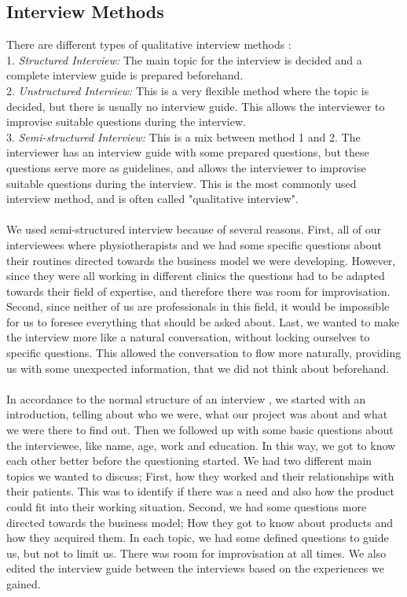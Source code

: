 \subsection{Interview Methods}
There are different types of qualitative interview methods \cite{interview} \cite{interview2}: \\ 
1. \emph{Structured Interview:} The main topic for the interview is decided and a complete interview guide is prepared beforehand. \\ 
2. \emph{Unstructured Interview:} This is a very flexible method where the topic is decided, but there is usually no interview guide. This allows the interviewer to improvise suitable questions during the interview. \\ 
3. \emph{Semi-structured Interview:} This is a mix between method 1 and 2. The interviewer has an interview guide with some prepared questions, but these questions serve more as guidelines, and allows the interviewer to improvise suitable questions during the interview. This is the most commonly used interview method, and is often called "qualitative interview". \cite{interview} \cite{interview2} \\ \\
We used semi-structured interview because of several reasons. First, all of our interviewees where physiotherapists and we had some specific questions about their routines directed towards the business model we were developing. However, since they were all working in different clinics the questions had to be adapted towards their field of expertise, and therefore there was room for improvisation. Second, since neither of us are professionals in this field, it would be impossible for us to foresee everything that should be asked about. Last, we wanted to make the interview more like a natural conversation, without locking ourselves to specific questions. This allowed the conversation to flow more naturally, providing us with some unexpected information, that we did not think about beforehand. \\ \\
In accordance to the normal structure of an interview \cite{interview2}, we started with an introduction, telling about who we were, what our project was about and what we were there to find out. Then we followed up with some basic questions about the interviewee, like name, age, work and education. In this way, we got to know each other better before the questioning started. We had two different main topics we wanted to discuss; First, how they worked and their relationships with their patients. This was to identify if there was a need and also how the product could fit into their working situation. Second, we had some questions more directed towards the business model; How they got to know about products and how they acquired them. In each topic, we had some defined questions to guide us, but not to limit us. There was room for improvisation at all times. We also edited the interview guide between the interviews based on the experiences we gained.

